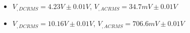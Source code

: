 \begin{itemize}
     \item $V_{, DCRMS}=4.23V\pm 0.01\unit{V}$, $V_{, ACRMS}=34.7mV\pm 0.01\unit{V}$ 
     \item $V_{, DCRMS}=10.16V\pm 0.01\unit{V}$, $V_{, ACRMS}=706.6mV\pm 0.01\unit{V}$\\
\end{itemize}